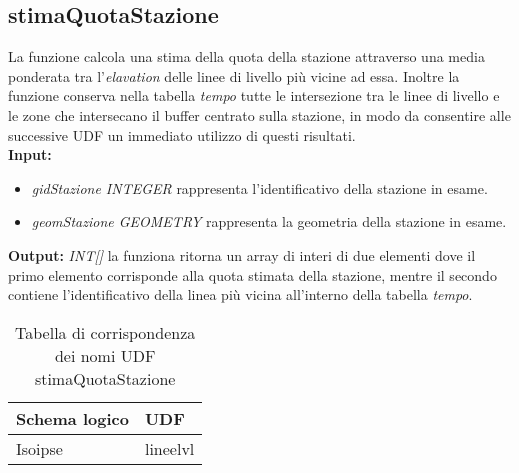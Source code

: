 \subsection{stimaQuotaStazione}
La funzione calcola una stima della quota della stazione attraverso una media ponderata tra l'\textit{elavation} delle linee di livello più vicine ad essa. Inoltre la funzione conserva nella tabella \textit{tempo} tutte le intersezione tra le linee di livello e le zone che intersecano il buffer centrato sulla stazione, in modo da consentire alle successive UDF un immediato utilizzo di questi risultati.\\
\textbf{Input:} 
\begin{itemize}
\item \textit{gidStazione INTEGER} rappresenta l'identificativo della stazione in esame.
\item \textit{geomStazione GEOMETRY} rappresenta la geometria della stazione in esame.
\end{itemize}
\textbf{Output:} \textit{INT[]} la funziona ritorna un array di interi di due elementi dove il primo elemento corrisponde alla quota stimata della stazione, mentre il secondo contiene l'identificativo della linea più vicina all'interno della tabella \textit{tempo}.

\begin{table}[h]
\centering
\caption{Tabella di corrispondenza dei nomi UDF stimaQuotaStazione}
\label{mapTb2}
\begin{tabular}{|l|l|}
\hline
Schema logico & UDF      \\ \hline
Isoipse       & lineelvl \\ \hline
\end{tabular}
\end{table} 

